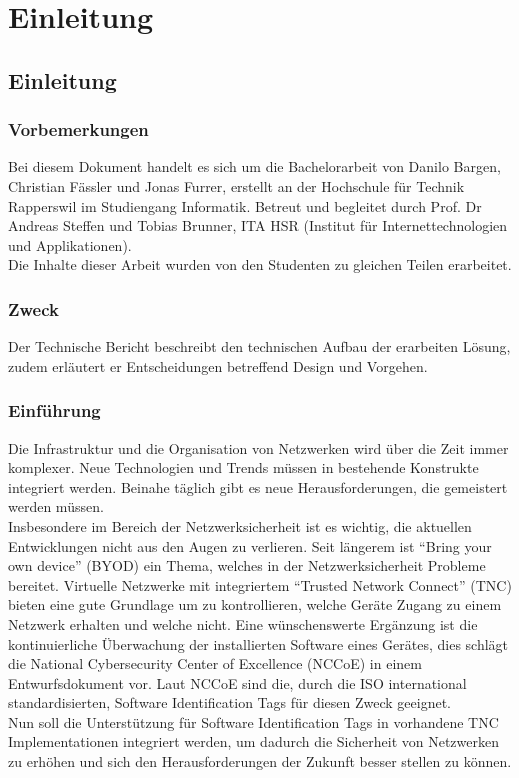 \chapter{Einleitung}
\section{Einleitung}

\subsection{Vorbemerkungen}
Bei diesem Dokument handelt es sich um die Bachelorarbeit von Danilo Bargen,
Christian Fässler und Jonas Furrer, erstellt an der Hochschule für Technik Rapperswil 
im Studiengang Informatik. Betreut und begleitet durch Prof. Dr
Andreas Steffen und Tobias Brunner, ITA HSR (Institut für Internettechnologien
und Applikationen).\\
Die Inhalte dieser Arbeit wurden von den Studenten zu gleichen Teilen
erarbeitet.

\subsection{Zweck}
Der Technische Bericht beschreibt den technischen Aufbau der erarbeiten Lösung,
zudem erläutert er Entscheidungen betreffend Design und Vorgehen.

\subsection{Einführung}
Die Infrastruktur und die Organisation von Netzwerken wird über die Zeit immer
komplexer. Neue Technologien und Trends müssen in bestehende Konstrukte
integriert werden. Beinahe täglich gibt es neue Herausforderungen, die
gemeistert werden müssen.\\
Insbesondere im Bereich der Netzwerksicherheit ist es wichtig, die aktuellen
Entwicklungen nicht aus den Augen zu verlieren. Seit längerem ist \enquote{Bring
your own device} (BYOD) ein Thema, welches in der Netzwerksicherheit Probleme
bereitet. Virtuelle Netzwerke mit integriertem \enquote{Trusted Network Connect}
(TNC) bieten eine gute Grundlage um zu kontrollieren, welche Geräte
Zugang zu einem Netzwerk erhalten und welche nicht. Eine wünschenswerte
Ergänzung ist die kontinuierliche Überwachung der installierten Software eines
Gerätes, dies schlägt die National Cybersecurity Center of Excellence (NCCoE) in
einem Entwurfsdokument vor. Laut NCCoE sind die, durch die ISO international
standardisierten, Software Identification Tags für diesen Zweck geeignet.\\
Nun soll die Unterstützung für Software Identification Tags in vorhandene TNC
Implementationen integriert werden, um dadurch die Sicherheit von Netzwerken zu
erhöhen und sich den Herausforderungen der Zukunft besser stellen zu können.